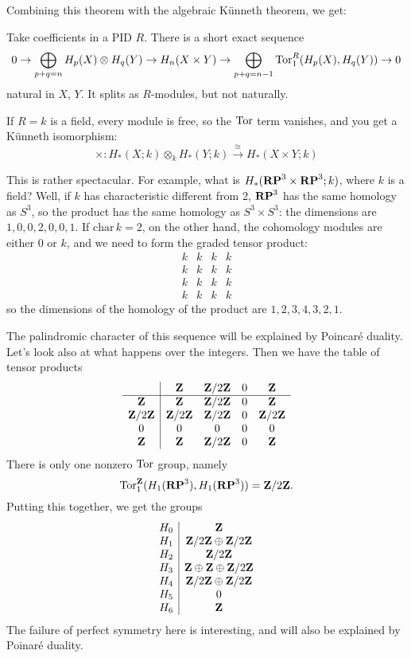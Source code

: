 Combining this theorem with the algebraic K\"unneth theorem, we get:
\begin{theorem}
Take coefficients in a PID $R$. There is a short exact sequence 
\begin{equation*}
0\to\bigoplus_{p+q=n} H_p(X)\otimes H_q(Y)\to
 H_n(X\times Y)\to\bigoplus_{p+q=n-1}\operatorname{Tor}^R_1( H_p(X), H_q(Y))\to 0
\end{equation*}
natural in $X$, $Y$. It splits as $R$-modules, but not naturally.
\end{theorem}
\begin{example}
If $R=k$ is a field, every module is free, so the $\operatorname{Tor}$ term vanishes, and you get a K\"{u}nneth isomorphism:
\begin{equation*}
\times: H_\ast(X;k)\otimes_k H_\ast(Y;k)\xrightarrow{\cong}H_\ast(X\times Y;k)
\end{equation*}
\end{example}
This is rather spectacular. For example, what is $ H_\ast(\mathbf{RP}^3\times\mathbf{RP}^3;k)$,
where $k$ is a field? Well, if $k$ has characteristic different from 2, 
$\mathbf{RP}^3$ has the same homology as $S^3$, so the product has the same 
homology as $S^3\times S^3$: the dimensions are $1,0,0,2,0,0,1$. 
If $\mathrm{char}\,k=2$, on the other hand, the cohomology modules are either
0 or $k$, and we need to form the graded tensor product:
\[
\begin{array}{cccc} k & k & k & k \\ k & k & k & k \\ 
k & k & k & k \\ k & k & k & k 
\end{array}
\]
so the dimensions of the homology of the product are 
$1,2,3,4,3,2,1$. 

The palindromic character of this sequence will be explained by Poincar\'e 
duality. Let's look also at what happens over the integers. Then we have 
the table of tensor products
\[
\begin{array}{c|cccc}
& \mathbf Z & \mathbf Z/2\mathbf Z & 0 & \mathbf Z \\
\hline
\mathbf Z & \mathbf Z & \mathbf Z/2\mathbf Z & 0 & \mathbf Z \\
\mathbf Z/2\mathbf Z & \mathbf Z/2\mathbf Z & \mathbf Z/2\mathbf Z & 0 & \mathbf Z/2\mathbf Z \\
0 & 0 & 0 & 0 & 0 \\
\mathbf Z & \mathbf Z & \mathbf Z/2\mathbf Z & 0 & \mathbf Z 
\end{array}
\]
There is only one nonzero $\operatorname{Tor}$ group, namely 
\[
\operatorname{Tor}_1^\mathbf Z(H_1(\mathbf{RP}^3),H_1(\mathbf{RP}^3))=\mathbf Z/2\mathbf Z.
\]
Putting this together, we get the groups
\[
\begin{array}{c|c}
H_0 & \mathbf Z \\
H_1 & \mathbf Z/2\mathbf Z\oplus\mathbf Z/2\mathbf Z\\
H_2 & \mathbf Z/2\mathbf Z \\
H_3 & \mathbf Z \oplus \mathbf Z \oplus\mathbf Z/2\mathbf Z \\
H_4 & \mathbf Z/2\mathbf Z\oplus\mathbf Z/2\mathbf Z\\
H_5 & 0 \\
H_6 & \mathbf Z
\end{array}
\]
The failure of perfect symmetry here is interesting, and will also be explained
by Poinar\'e duality. 






